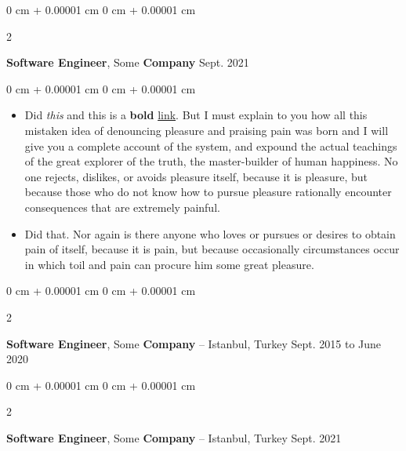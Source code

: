 \documentclass[10pt, letterpaper]{article}
\newenvironment{highlights}{
    \begin{itemize}[
        topsep=0.10 cm,
        parsep=0.10 cm,
        partopsep=0pt,
        itemsep=0pt,
        leftmargin=0 cm + 10pt
    ]
}{
    \end{itemize}
} %
\newenvironment{onecolentry}{
    \begin{adjustwidth}{
        0 cm + 0.00001 cm
    }{
        0 cm + 0.00001 cm
    }
}{
    \end{adjustwidth}
} %
\newenvironment{twocolentry}[2][]{
    \onecolentry
    \def\secondColumn{#2}
    \setcolumnwidth{\fill, 4.5 cm}
    \begin{paracol}{2}
}{
    \switchcolumn \raggedleft \secondColumn
    \end{paracol}
    \endonecolentry
} %
\begin{document}
        \vspace{0.2 cm}

        \begin{twocolentry}{
            Sept. 2021
        }
            \textbf{Software Engineer}, Some \textbf{Company}\end{twocolentry}

        \vspace{0.10 cm}
        \begin{onecolentry}
            \begin{highlights}
                \item Did \textit{this} and this is a \textbf{bold} \href{https://example.com}{link}. But I must explain to you how all this mistaken idea of denouncing pleasure and praising pain was born and I will give you a complete account of the system, and expound the actual teachings of the great explorer of the truth, the master-builder of human happiness. No one rejects, dislikes, or avoids pleasure itself, because it is pleasure, but because those who do not know how to pursue pleasure rationally encounter consequences that are extremely painful.
                \item Did that. Nor again is there anyone who loves or pursues or desires to obtain pain of itself, because it is pain, but because occasionally circumstances occur in which toil and pain can procure him some great pleasure.
            \end{highlights}
        \end{onecolentry}


        \vspace{0.2 cm}

        \begin{twocolentry}{
            Sept. 2015 to June 2020
        }
            \textbf{Software Engineer}, Some \textbf{Company} -- Istanbul, Turkey\end{twocolentry}



        \vspace{0.2 cm}

        \begin{twocolentry}{
            Sept. 2021
        }
            \textbf{Software Engineer}, Some \textbf{Company} -- Istanbul, Turkey\end{twocolentry}



        \vspace{0.2 cm}
\end{document}
